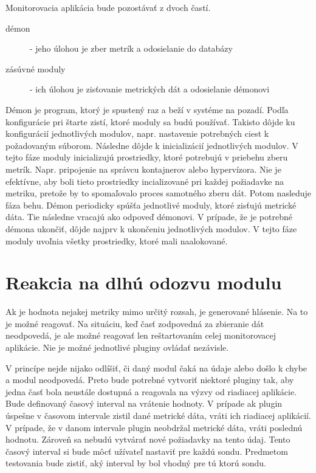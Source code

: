 \documentclass[11pt,final,oneside]{fithesis}
\begin{document}
Monitorovacia aplikácia bude pozostávať z dvoch častí.
\begin{description}
\item[démon] - jeho úlohou je zber metrík a odosielanie do databázy
\item[zásúvné moduly] - ich úlohou je zisťovanie metrických dát a odosielanie démonovi
\end{description}

Démon je program, ktorý je spustený raz a beží v systéme na pozadí. Podľa konfigurácie pri štarte zistí, ktoré moduly sa budú používať. Takisto dôjde ku konfigurácií jednotlivých modulov, napr. nastavenie
potrebných ciest k požadovaným súborom. Následne dôjde k inicializácií jednotlivých modulov. V tejto fáze moduly inicializujú prostriedky, ktoré potrebujú v priebehu zberu metrík. Napr. pripojenie na správcu kontajnerov alebo hypervízora. Nie je efektívne, aby boli tieto prostriedky incializované pri
každej požiadavke na metriku, pretože by to spomaľovalo proces samotného zberu dát. Potom nasleduje fáza behu. Démon periodicky spúšťa jednotlivé moduly, ktoré zisťujú metrické dáta. Tie následne
vracajú ako odpoveď démonovi. V prípade, že je potrebné démona ukončiť, dôjde najprv k ukončeniu jednotlivých modulov. V tejto fáze moduly uvoľnia všetky prostriedky, ktoré mali naalokované.


\section{Reakcia na dlhú odozvu modulu}
Ak je hodnota nejakej metriky mimo určitý rozsah, je generované hlásenie. Na to je možné reagovať.
Na situáciu, keď časť zodpovedná za zbieranie dát neodpovedá, je ale možné reagovať len reštartovaním celej monitorovacej aplikácie. Nie je možné jednotlivé pluginy ovládať nezávisle. 

V princípe nejde nijako odlíšiť, či daný modul čaká na údaje alebo došlo k chybe a modul neodpovedá. Preto bude potrebné vytvoriť niektoré pluginy tak, aby jedna časť bola neustále dostupná 
a reagovala na výzvy od riadiacej aplikácie. Bude definovaný časový interval na vrátenie hodnoty. V prípade ak plugin úspešne v časovom intervale zistil dané metrické dáta, vráti ich riadiacej aplikácií. V prípade, že v danom intervale plugin neobdržal metrické dáta,
vráti poslednú hodnotu. Zároveň sa nebudú vytvárať nové požiadavky na tento údaj. Tento časový interval si bude môcť užívateľ nastaviť pre každú sondu. Predmetom testovania bude zistiť, 
aký interval by bol vhodný pre tú ktorú sondu.
\end{document}
